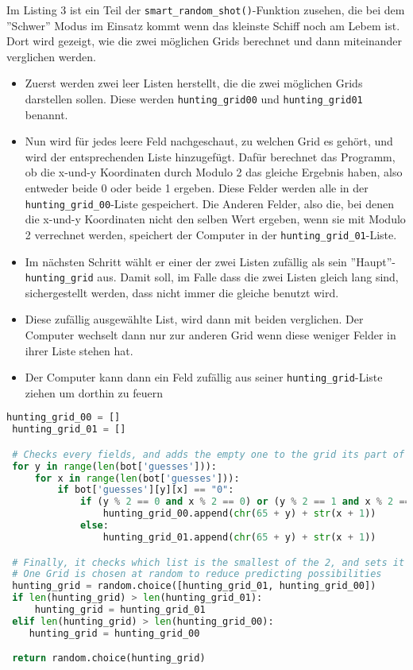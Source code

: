 \documentclass{article}
\begin{document}
\par
    Im Listing 3 ist ein Teil der \verb$smart_random_shot()$-Funktion zusehen, die bei dem ''Schwer'' Modus im Einsatz kommt wenn das kleinste Schiff noch am Lebem ist. Dort wird gezeigt, wie die zwei möglichen Grids berechnet und dann miteinander verglichen werden.
\setlist{}%
\begin{itemize}
\itemsep0em
    \item Zuerst werden zwei leer Listen herstellt, die die zwei möglichen Grids darstellen sollen. Diese werden \verb$hunting_grid00$ und \verb$hunting_grid01$ benannt.

    \item Nun wird für jedes leere Feld nachgeschaut, zu welchen Grid es gehört, und wird der entsprechenden Liste hinzugefügt. Dafür berechnet das Programm, ob die x-und-y Koordinaten durch Modulo 2 das gleiche Ergebnis haben, also entweder beide 0 oder beide 1 ergeben. Diese Felder werden alle in der \verb$hunting_grid_00$-Liste gespeichert. Die Anderen Felder, also die, bei denen die x-und-y Koordinaten nicht den selben Wert ergeben, wenn sie mit Modulo 2 verrechnet werden, speichert der Computer in der \verb$hunting_grid_01$-Liste.

    \item Im nächsten Schritt wählt er einer der zwei Listen zufällig als sein ''Haupt''-\verb$hunting_grid$ aus. Damit soll, im Falle dass die zwei Listen gleich lang sind, sichergestellt werden, dass nicht immer die gleiche benutzt wird.

    \item Diese zufällig ausgewählte List, wird dann mit beiden verglichen. Der Computer wechselt dann nur zur anderen Grid wenn diese weniger Felder in ihrer Liste stehen hat.

    \item Der Computer kann dann ein Feld zufällig aus seiner \verb$hunting_grid$-Liste ziehen um dorthin zu feuern
\end{itemize}

\begin{lstlisting}[language=Python, caption = Herstellung der zwei möglich Grids und deren Vergleich]
 hunting_grid_00 = []
 hunting_grid_01 = []

 # Checks every fields, and adds the empty one to the grid its part of
 for y in range(len(bot['guesses'])):
     for x in range(len(bot['guesses'])):
         if bot['guesses'][y][x] == "0":
             if (y % 2 == 0 and x % 2 == 0) or (y % 2 == 1 and x % 2 == 1):
                 hunting_grid_00.append(chr(65 + y) + str(x + 1))
             else:
                 hunting_grid_01.append(chr(65 + y) + str(x + 1))

 # Finally, it checks which list is the smallest of the 2, and sets it as our hunting grid
 # One Grid is chosen at random to reduce predicting possibilities
 hunting_grid = random.choice([hunting_grid_01, hunting_grid_00])
 if len(hunting_grid) > len(hunting_grid_01):
     hunting_grid = hunting_grid_01
 elif len(hunting_grid) > len(hunting_grid_00):
    hunting_grid = hunting_grid_00

 return random.choice(hunting_grid)
\end{lstlisting}
\end{document}
